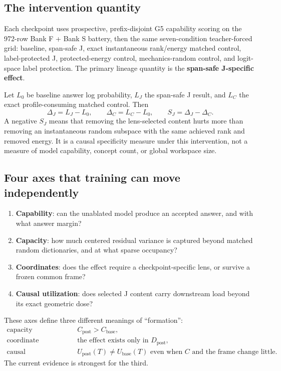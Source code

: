 \documentclass[11pt]{article}
\newcommand{\SJ}{S_J}
\newcommand{\dJ}{\Delta_J}
\newcommand{\dC}{\Delta_C}
\begin{document}
\subsection{The intervention quantity}

Each checkpoint uses prospective, prefix-disjoint G5 capability scoring on the
972-row Bank F + Bank S battery, then the same seven-condition teacher-forced
grid: baseline, span-safe J, exact instantaneous rank/energy matched control,
label-protected J, protected-energy control, mechanics-random control, and
logit-space label protection. The primary lineage quantity is the
\textbf{span-safe J-specific effect}.

Let $L_0$ be baseline answer log probability, $L_J$ the span-safe J result,
and $L_C$ the exact profile-consuming matched control. Then
\[
\dJ=L_J-L_0,\qquad
\dC=L_C-L_0,\qquad
\SJ=\dJ-\dC.
\]
A negative $\SJ$ means that removing the lens-selected content hurts more than
removing an instantaneous random subspace with the same achieved rank and
removed energy. It is a causal specificity measure under this intervention,
not a measure of model capability, concept count, or global workspace size.

\subsection{Four axes that training can move independently}\label{sec:axes}

\begin{enumerate}
  \item \textbf{Capability}: can the unablated model produce an accepted answer, and with what answer margin?
  \item \textbf{Capacity}: how much centered residual variance is captured beyond matched random dictionaries, and at what sparse occupancy?
  \item \textbf{Coordinates}: does the effect require a checkpoint-specific lens, or survive a frozen common frame?
  \item \textbf{Causal utilization}: does selected J content carry downstream load beyond its exact geometric dose?
\end{enumerate}

These axes define three different meanings of ``formation'':
\begin{align*}
\text{capacity formation:}&\quad C_{\text{post}}>C_{\text{base}},\\
\text{coordinate formation:}&\quad \text{the effect exists only in }D_{\text{post}},\\
\text{causal recruitment:}&\quad U_{\text{post}}(T)\ne U_{\text{base}}(T)
\text{ even when }C\text{ and the frame change little.}
\end{align*}
The current evidence is strongest for the third.
\end{document}
